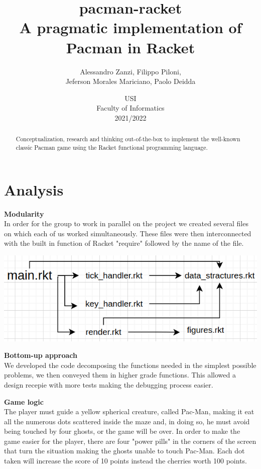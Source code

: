 \documentclass{article}
\title{
\textbf{pacman-racket} \\
A pragmatic implementation of Pacman in Racket
}
\author{
    Alessandro Zanzi,
    Filippo Piloni,\\
    Jeferson Morales Mariciano,
    Paolo Deidda
}
\date{
USI \\
Faculty of Informatics \\
[\baselineskip]  2021/2022
}
\begin{document}
\begin{titlepage}
\maketitle

\end{titlepage}
 \begin{abstract}
Conceptualization, research and thinking out-of-the-box
to implement the well-known classic Pacman game
using the Racket functional programming language.
 \end{abstract}
\clearpage
 \tableofcontents
 \clearpage
 \section{Analysis}
 
 \hspace{0.5cm}\textbf{Modularity}\\
 In order for the group to work in parallel on the project we created several files on which each of us worked simultaneously. These files were then interconnected with the built in function of Racket "require" followed by the name of the file.
 
 \includegraphics{images/dependency_three.png}
 
 
 \textbf{Bottom-up approach}\\
 We developed the code decomposing the functions needed in the simplest possible problems, we then conveyed them in higher grade functions. This allowed a design recepie with more tests making the debugging process easier.
 
 \textbf{Game logic}\\
The player must guide a yellow spherical creature, called Pac-Man, making it eat all the numerous dots scattered inside the maze and, in doing so, he must avoid being touched by four ghosts, or the game will be over. In order to make the game easier for the player, there are four "power pills" in the corners of the screen that turn the situation making the ghosts unable to touch Pac-Man. Each dot taken will increase the score of 10 points instead the cherries worth 100 points.
\end{document}
